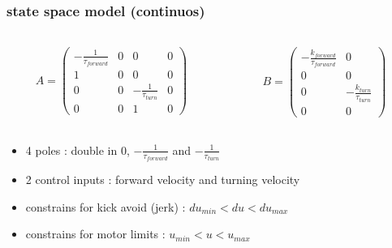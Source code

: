 \documentclass{beamer}
\begin{document}
\begin{frame}
\frametitle{\textbf { state space model (continuos)}}

  \begin{columns}

    \begin{column}{0.5\textwidth}

      \begin{align*}
        A =
        \begin{pmatrix}
          -\frac{1}{\tau_{forward}} & 0 & 0 & 0 \\
          1 & 0 & 0 & 0 \\
          0 & 0 & -\frac{1}{\tau_{turn}} & 0 \\
          0 & 0 & 1 & 0 
        \end{pmatrix}
      \end{align*}
    
    \end{column}


    \begin{column}{0.5\textwidth}

      \begin{align*}
        B =
        \begin{pmatrix}
          -\frac{k_{forward}}{\tau_{forward}} & 0 \\
          0 & 0 \\
          0 & -\frac{k_{turn}}{\tau_{turn}} \\
          0 & 0
        \end{pmatrix}
      \end{align*}

    \end{column}


  \end{columns}

  \begin{itemize}
    \item 4 poles : double in $0$, $-\frac{1}{\tau_{forward}}$ and $-\frac{1}{\tau_{turn}}$
    \item 2 control inputs : forward velocity and turning velocity
    \item constrains for kick avoid (jerk) : $du_{min} < du < du_{max}$
    \item constrains for motor limits : $u_{min} < u < u_{max}$
  \end{itemize}

\end{frame}
\end{document}

